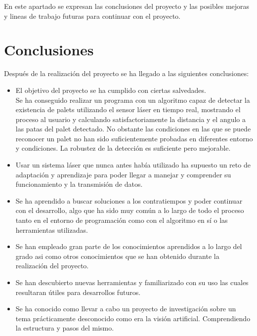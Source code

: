 
En este apartado se expresan las conclusiones del proyecto y las posibles mejoras y lineas de trabajo futuras para continuar con el proyecto.

\section{Conclusiones}

Después de la realización del proyecto se ha llegado a las siguientes conclusiones:

\begin{itemize}
\item El objetivo del proyecto se ha cumplido con ciertas salvedades.\\
	Se ha conseguido realizar un programa con un algoritmo capaz de detectar la existencia de palets utilizando el sensor láser en tiempo real, mostrando el proceso al usuario y calculando satisfactoriamente la distancia y el angulo a las patas del palet detectado. No obstante las condiciones en las que se puede reconocer un palet no han sido suficientemente probadas en diferentes entorno y condiciones.
La robustez de la detección es suficiente pero mejorable.

\item Usar un sistema láser que nunca antes había utilizado ha supuesto un reto de adaptación y aprendizaje para poder llegar a manejar y comprender su funcionamiento y la transmisión de datos.

\item Se ha aprendido a buscar soluciones a los contratiempos y poder continuar con el desarrollo, algo que ha sido muy común a lo largo de todo el proceso tanto en el entorno de programación como con el algoritmo en sí o las herramientas utilizadas.

\item Se han empleado gran parte de los conocimientos aprendidos a lo largo del grado asi como otros conocimientos que se han obtenido durante la realización del proyecto.

\item Se han descubierto nuevas herramientas y familiarizado con su uso las cuales resultaran útiles para desarrollos futuros.

\item Se ha conocido como llevar a cabo un proyecto de investigación sobre un tema prácticamente desconocido como era la visión artificial. Comprendiendo la estructura y pasos del mismo.


\end{itemize}
